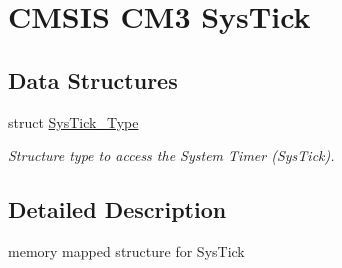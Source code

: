 \hypertarget{group___c_m_s_i_s___c_m3___sys_tick}{\section{C\-M\-S\-I\-S C\-M3 Sys\-Tick}
\label{group___c_m_s_i_s___c_m3___sys_tick}
}
\subsection*{Data Structures}
\begin{DoxyCompactItemize}
\item 
struct \hyperlink{struct_sys_tick___type}{Sys\-Tick\-\_\-\-Type}
\begin{DoxyCompactList}\small\item\em Structure type to access the System Timer (Sys\-Tick). \end{DoxyCompactList}\end{DoxyCompactItemize}


\subsection{Detailed Description}
memory mapped structure for Sys\-Tick 